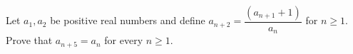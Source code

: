 Let $a_1,a_2$ be positive real numbers and define $a_{n+2}=\dfrac{(a_{n+1}+1)}{a_n}$ for $n\ge1$. Prove that $a_{n+5}=a_n$ for every $n\ge1$.
